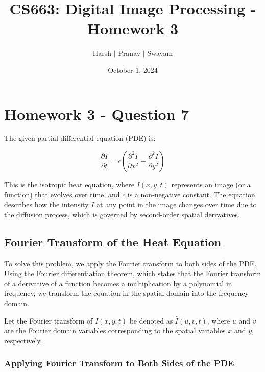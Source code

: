 \documentclass{article}
\title{CS663: Digital Image Processing - Homework 3}
\author{Harsh $\vert$ Pranav $\vert$ Swayam}
\date{October 1, 2024}
\begin{document}
\maketitle
\section{Homework 3 - Question 7}


The given partial differential equation (PDE) is:

\[
\frac{\partial I}{\partial t} = c \left( \frac{\partial^2 I}{\partial x^2} + \frac{\partial^2 I}{\partial y^2} \right)
\]

This is the isotropic heat equation, where \( I(x, y, t) \) represents an image (or a function) that evolves over time, and \( c \) is a non-negative constant. The equation describes how the intensity \( I \) at any point in the image changes over time due to the diffusion process, which is governed by second-order spatial derivatives.


\subsection*{Fourier Transform of the Heat Equation}

To solve this problem, we apply the Fourier transform to both sides of the PDE. Using the Fourier differentiation theorem, which states that the Fourier transform of a derivative of a function becomes a multiplication by a polynomial in frequency, we transform the equation in the spatial domain into the frequency domain.

Let the Fourier transform of \( I(x, y, t) \) be denoted as \( \hat{I}(u, v, t) \), where \( u \) and \( v \) are the Fourier domain variables corresponding to the spatial variables \( x \) and \( y \), respectively.

\subsubsection*{Applying Fourier Transform to Both Sides of the PDE}
\end{document}
